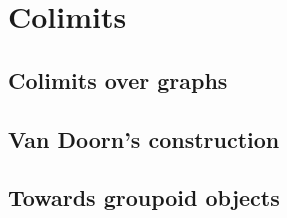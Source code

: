 \chapter{Colimits}
\label{chap:colim}

\section{Colimits over graphs}
\label{sec:colim}

\section{Van Doorn's construction}
\label{sec:floris}

\section{Towards groupoid objects}
\label{sec:groupoid}